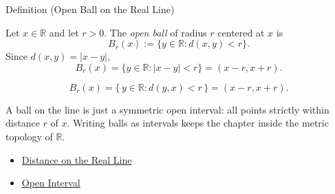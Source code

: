 \begin{definitionbox}{Definition (Open Ball on the Real Line)}
\begin{definition}
\label{def:open-ball}
Let $x\in\mathbb{R}$ and let $r>0$.  The \emph{open ball} of radius $r$
centered at $x$ is
\[
  B_r(x):=\{y\in\mathbb{R}:d(x,y)<r\}.
\]
Since $d(x,y)=|x-y|$,
\[
  B_r(x)
  =
  \{y\in\mathbb{R}:|x-y|<r\}
  =
  (x-r,x+r).
\]
\end{definition}
\end{definitionbox}
\begin{remark*}
\[
B_{r}(x)=\{\,y\in\mathbb{R} : d(y,x)<r\,\}=(x-r,x+r).
\]
\end{remark*}
\begin{remark*}[Interpretation]
A ball on the line is just a symmetric open interval: all points strictly within distance $r$ of $x$. Writing balls as intervals keeps the chapter inside the metric topology of $\mathbb{R}$.
\end{remark*}
\begin{dependencies}
\begin{itemize}
  \item \hyperref[def:distance-on-real-line]{Distance on the Real Line}
  \item \hyperref[def:open-interval]{Open Interval}
\end{itemize}
\end{dependencies}
